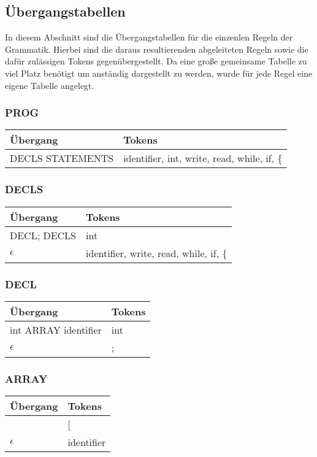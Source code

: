 \documentclass[
a4paper,   %
11pt,      %
oneside,   %
onecolumn, %
final      %
]{article}
\begin{document}
\subsection{\"Ubergangstabellen}
In diesem Abschnitt sind die Übergangstabellen für die einzenlen Regeln der Grammatik. Hierbei sind die daraus resultierenden abgeleiteten Regeln sowie die dafür zulässigen Tokens gegenübergestellt.
Da eine große gemeinsame Tabelle zu viel Platz benötigt um anständig dargestellt zu werden, wurde für jede Regel eine eigene Tabelle angelegt.
\newline

\subsubsection{PROG}
\begin{tabular}{| l | l |}
	\hline
		\"Ubergang & Tokens \\
		\hline
		DECLS STATEMENTS & identifier, int, write, read, while, if, \{ \\
	\hline
\end{tabular}
\newline

\subsubsection{DECLS}
\begin{tabular}{| l | l |}
	\hline
		\"Ubergang & Tokens \\
		\hline
		DECL; DECLS & int \\
		$\epsilon$ & identifier, write, read, while, if, $\{$ \\
	\hline
\end{tabular}
\newline

\subsubsection{DECL}
\begin{tabular}{| l | l |}
	\hline
		\"Ubergang & Tokens \\
		\hline
		int ARRAY identifier & int \\
		$\epsilon$ & ; \\
	\hline
\end{tabular}
\newline

\subsubsection{ARRAY}
\begin{tabular}{| l | l |}
	\hline
		\"Ubergang & Tokens \\
		\hline
		[integer] & [ \\
		$\epsilon$ & identifier \\
	\hline
\end{tabular}
\newline
\end{document}
